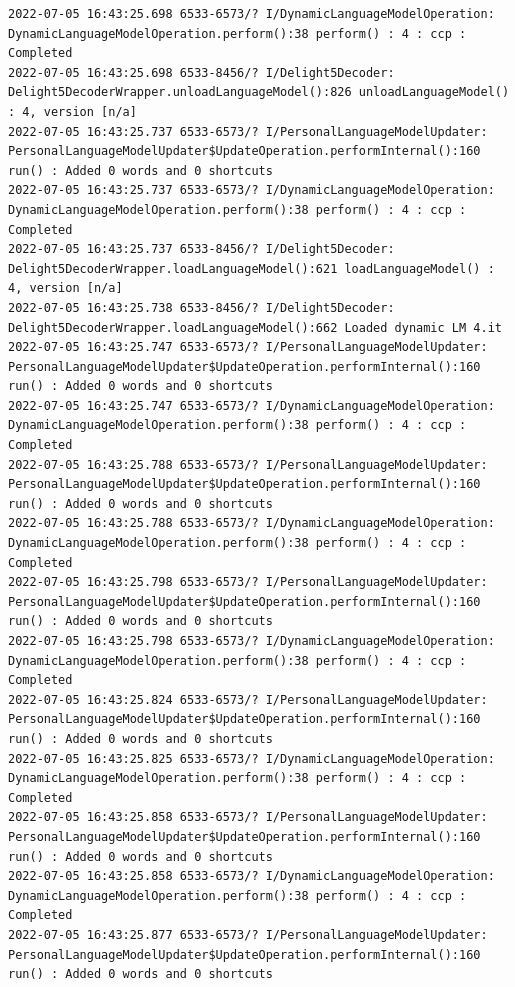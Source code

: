 \documentclass[a4paper,12pt]{book}
\begin{document}
\begin{lstlisting}
2022-07-05 16:43:25.698 6533-6573/? I/DynamicLanguageModelOperation: DynamicLanguageModelOperation.perform():38 perform() : 4 : ccp : Completed
2022-07-05 16:43:25.698 6533-8456/? I/Delight5Decoder: Delight5DecoderWrapper.unloadLanguageModel():826 unloadLanguageModel() : 4, version [n/a]
2022-07-05 16:43:25.737 6533-6573/? I/PersonalLanguageModelUpdater: PersonalLanguageModelUpdater$UpdateOperation.performInternal():160 run() : Added 0 words and 0 shortcuts
2022-07-05 16:43:25.737 6533-6573/? I/DynamicLanguageModelOperation: DynamicLanguageModelOperation.perform():38 perform() : 4 : ccp : Completed
2022-07-05 16:43:25.737 6533-8456/? I/Delight5Decoder: Delight5DecoderWrapper.loadLanguageModel():621 loadLanguageModel() : 4, version [n/a]
2022-07-05 16:43:25.738 6533-8456/? I/Delight5Decoder: Delight5DecoderWrapper.loadLanguageModel():662 Loaded dynamic LM 4.it
2022-07-05 16:43:25.747 6533-6573/? I/PersonalLanguageModelUpdater: PersonalLanguageModelUpdater$UpdateOperation.performInternal():160 run() : Added 0 words and 0 shortcuts
2022-07-05 16:43:25.747 6533-6573/? I/DynamicLanguageModelOperation: DynamicLanguageModelOperation.perform():38 perform() : 4 : ccp : Completed
2022-07-05 16:43:25.788 6533-6573/? I/PersonalLanguageModelUpdater: PersonalLanguageModelUpdater$UpdateOperation.performInternal():160 run() : Added 0 words and 0 shortcuts
2022-07-05 16:43:25.788 6533-6573/? I/DynamicLanguageModelOperation: DynamicLanguageModelOperation.perform():38 perform() : 4 : ccp : Completed
2022-07-05 16:43:25.798 6533-6573/? I/PersonalLanguageModelUpdater: PersonalLanguageModelUpdater$UpdateOperation.performInternal():160 run() : Added 0 words and 0 shortcuts
2022-07-05 16:43:25.798 6533-6573/? I/DynamicLanguageModelOperation: DynamicLanguageModelOperation.perform():38 perform() : 4 : ccp : Completed
2022-07-05 16:43:25.824 6533-6573/? I/PersonalLanguageModelUpdater: PersonalLanguageModelUpdater$UpdateOperation.performInternal():160 run() : Added 0 words and 0 shortcuts
2022-07-05 16:43:25.825 6533-6573/? I/DynamicLanguageModelOperation: DynamicLanguageModelOperation.perform():38 perform() : 4 : ccp : Completed
2022-07-05 16:43:25.858 6533-6573/? I/PersonalLanguageModelUpdater: PersonalLanguageModelUpdater$UpdateOperation.performInternal():160 run() : Added 0 words and 0 shortcuts
2022-07-05 16:43:25.858 6533-6573/? I/DynamicLanguageModelOperation: DynamicLanguageModelOperation.perform():38 perform() : 4 : ccp : Completed
2022-07-05 16:43:25.877 6533-6573/? I/PersonalLanguageModelUpdater: PersonalLanguageModelUpdater$UpdateOperation.performInternal():160 run() : Added 0 words and 0 shortcuts

\end{lstlisting}
\end{document}
